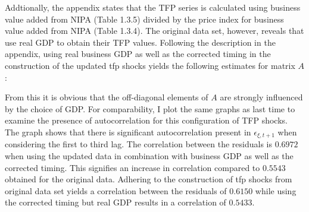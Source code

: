Addtionally, the appendix states that the TFP series is calculated using business value added from NIPA (Table 1.3.5) divided by the price index for business value added from NIPA (Table 1.3.4). The original data set, however, reveals that \citeauthor{JERMANNfinancial} use real GDP to obtain their TFP values. Following the description in the appendix, using real business GDP as well as the corrected timing in the construction of the updated tfp shocks yields the following estimates for matrix $A$:


From this it is obvious that the off-diagonal elements of $A$ are strongly influenced by the choice of GDP. 
For comparability, I plot the same graphs as last time to examine the presence of  autocorrelation for this configuration of TFP shocks.\\[1.5ex]


The graph shows that there is significant autocorrelation present in ${\epsilon}_{\xi,t+1}$ when considering the first to third lag.
The correlation between the residuals is $0.6972$ when using the updated data in combination with business GDP as well as the corrected timing. This signifies an increase in correlation compared to $0.5543$ obtained for the original data. Adhering to the construction of tfp shocks from original data set yields a correlation between the residuals of $0.6150$ while using the corrected timing but real GDP results in a correlation of $0.5433$.